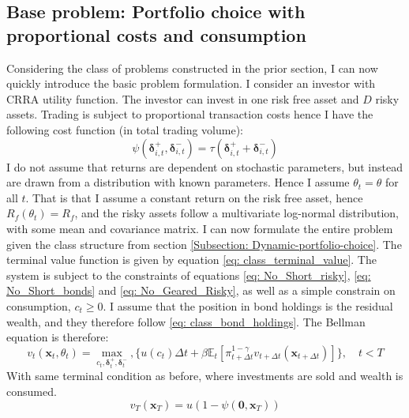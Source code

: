 \documentclass[11pt]{article}
\begin{document}
\subsection{Base problem: Portfolio choice with proportional costs and consumption}\label{Subsection: Base_Problem}
Considering the class of problems constructed in the prior section,
I can now quickly introduce the basic problem formulation.
I consider an investor with CRRA utility function. The investor can invest in one risk free asset and $D$ risky assets.
Trading is subject to proportional transaction costs hence I have the following cost function (in total trading volume):
\begin{equation} \label{eq: base_model_transaction-cost}
  \psi (\boldsymbol{\delta}^{+}_{i,t}, \boldsymbol{\delta}^{-}_{i,t} ) = \tau (\boldsymbol{\delta}^{+}_{i,t} + \boldsymbol{\delta}^{-}_{i,t}) 
\end{equation}
I do not assume that returns are dependent on stochastic parameters, but instead are drawn from a distribution with known parameters.
Hence I assume \( \theta_{t} = \theta \) for all $t$. That is that I assume a constant return on the risk free asset, hence $R_{f}(\theta_t) = R_{f}$,
and the risky assets follow a multivariate log-normal distribution, with some mean and covariance matrix.
I can now formulate the entire problem given the class structure from section \ref{Subsection: Dynamic-portfolio-choice}.
The terminal value function is given by equation \eqref{eq: class_terminal_value}. 
The system is subject to the constraints of equations \eqref{eq: No_Short_risky}, \eqref{eq: No_Short_bonds} and \eqref{eq: No_Geared_Risky},
as well as a simple constrain on consumption, $c_t \geq 0$.
I assume that the position in bond holdings is the residual wealth, and they therefore follow
\eqref{eq: class_bond_holdings}. The Bellman equation is therefore:
\[  
  v_{t} (\mathbf{x}_{t}, \theta_t) = \max_{c_t , \boldsymbol{\delta}^{+}_{t}, \boldsymbol{\delta}^{-}_{t}  },  \{ u(c_t) 
  \Delta t + \beta \mathbb{E}_{t} \left[ 
    \pi_{t+\Delta t}^{1-\gamma}
    v_{t+\Delta t} (\mathbf{x}_{t+\Delta t }) 
    \right] \} , \quad t < T 
\]
With same terminal condition as before, where investments are sold and wealth is consumed.
\[
  v_T (\mathbf{x}_T) = u  (1 - \psi( \mathbf{0},\mathbf{x}_T))
\]
\end{document}
